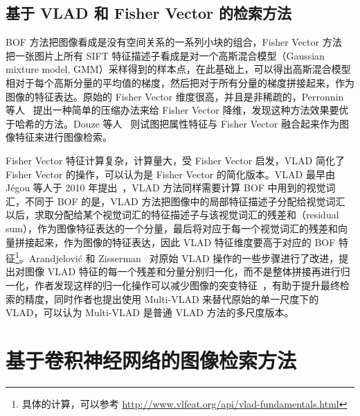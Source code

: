 \subsection{基于 VLAD 和 Fisher Vector 的检索方法}
BOF 方法把图像看成是没有空间关系的一系列小块的组合，Fisher Vector 方法~\cite{Perronnin2007FisherKO} 把一张图片上所有 SIFT 特征描述子看成是对一个高斯混合模型（Gaussian mixture model, GMM）采样得到的样本点，在此基础上，可以得出高斯混合模型相对于每个高斯分量的平均值的梯度，然后把对于所有分量的梯度拼接起来，作为图像的特征表达。原始的 Fisher Vector 维度很高，并且是非稀疏的，Perronnin 等人~\cite{Perronnin2010LargescaleIR} 提出一种简单的压缩办法来给 Fisher Vector 降维，发现这种方法效果要优于哈希的方法。Douze 等人~\cite{Douze2011CombiningAA} 则试图把属性特征与 Fisher Vector 融合起来作为图像特征来进行图像检索。

Fisher Vector 特征计算复杂，计算量大，受 Fisher Vector 启发，VLAD 简化了 Fisher Vector 的操作，可以认为是 Fisher Vector 的简化版本。VLAD 最早由 J{\'e}gou 等人于 2010 年提出~\cite{Jgou2010AggregatingLD}，VLAD 方法同样需要计算 BOF 中用到的视觉词汇，不同于 BOF 的是，VLAD 方法把图像中的局部特征描述子分配给视觉词汇以后，求取分配给某个视觉词汇的特征描述子与该视觉词汇的残差和（residual sum），作为图像特征表达的一个分量，最后将对应于每一个视觉词汇的残差和向量拼接起来，作为图像的特征表达，因此 VLAD 特征维度要高于对应的 BOF 特征\footnote{具体的计算，可以参考 \url{http://www.vlfeat.org/api/vlad-fundamentals.html}}。Arandjelovi{\'c} 和 Zisserman~\cite{Arandjelovic2013AllAV} 对原始 VLAD 操作的一些步骤进行了改进，提出对图像 VLAD 特征的每一个残差和分量分别归一化，而不是整体拼接再进行归一化，作者发现这样的归一化操作可以减少图像的突变特征~\cite{Jgou2009OnTB}，有助于提升最终检索的精度，同时作者也提出使用 Multi-VLAD 来替代原始的单一尺度下的 VLAD，可以认为 Multi-VLAD 是普通 VLAD 方法的多尺度版本。

\section{基于卷积神经网络的图像检索方法}\label{sec:review_cnn_image_retrieval}
